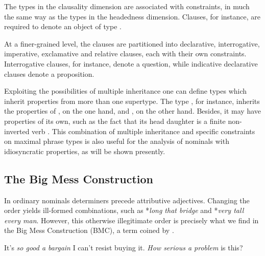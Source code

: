 \documentclass[output=paper]{langsci/langscibook}
\begin{document}
The types in the {\sc clausality} dimension are associated with constraints,
in much the same way as the types in the {\sc headedness} dimension.  
Clauses, for instance, are required to denote an object of type  
\citep[41]{GS00}.

\begin{exe}
\ex 
\begin{avm} 
\end{avm}
\end{exe}

\noindent
At a finer-grained level, the clauses are partitioned into 
declarative, interrogative, imperative, exclamative and relative
clauses, each with their own constraints. 
Interrogative clauses, for instance, denote a question, 
while indicative declarative clauses denote a proposition.

Exploiting the possibilities of multiple inheritance one can 
define types which inherit properties from more than one supertype. 
The type , for instance, inherits 
the properties of , on the one hand, and 
, on the other hand. Besides, it may 
have properties of its own, such as the fact that its head daughter 
is a finite non-inverted verb \citep[43]{GS00}. 
This combination of multiple inheritance and specific   
constraints on maximal phrase types is also useful for the analysis of 
nominals with idiosyncratic properties, as will be shown presently. 


\subsection{The Big Mess Construction} 


In ordinary nominals determiners precede attributive adjectives. Changing the order 
yields ill-formed combinations, such as *\emph{long that bridge} and *\emph{very tall every man}. 
However, this otherwise illegitimate order is precisely what we find in 
the Big Mess Construction (BMC), a term coined by \citet{Berman74}.  

\begin{exe}
\ex\label{bime}
\begin{xlist}
\ex   It's \emph{so good a bargain} I can't resist buying it.
\ex   \emph{How serious a problem} is this?
\end{xlist}
\end{exe} 
\end{document}

